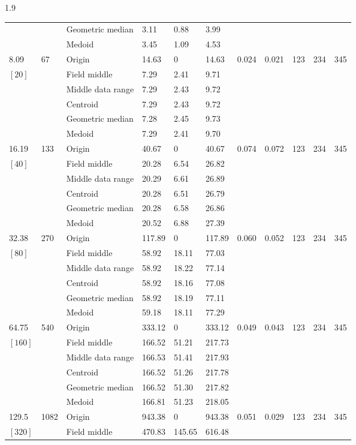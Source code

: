 \documentclass[phd]{ndsu-thesis-2022}
\newcommand\myspacing{1.9} %
\begin{document}
\begin{spacing}{\myspacing}
\begin{landscape}
{{\begin{ThreePartTable}
\begin{longtable}{lll lll ll rrr}
 &  & Geometric median & 3.11 & 0.88 & 3.99 \\
 &  & Medoid  & 3.45 & 1.09 & 4.53 \\
\midrule
8.09 & 67 & Origin  & 14.63 & 0 & 14.63 & 0.024 & 0.021 & 123 & 234 & 345 \\
$[20]$ &  & Field middle  & 7.29 & 2.41 & 9.71 \\
 &  & Middle data range  & 7.29 & 2.43 & 9.72 \\
 &  & Centroid & 7.29 & 2.43 & 9.72 \\
 &  & Geometric median & 7.28 & 2.45 & 9.73 \\
 &  & Medoid  & 7.29 & 2.41 & 9.70 \\ 
\midrule
16.19 & 133 & Origin  & 40.67 & 0 & 40.67 & 0.074 & 0.072 & 123 & 234 & 345 \\
$[40]$ &  & Field middle  & 20.28 & 6.54 & 26.82 \\
 &  & Middle data range  & 20.29 & 6.61 & 26.89 \\
 &  & Centroid & 20.28 & 6.51 & 26.79 \\
 &  & Geometric median & 20.28 & 6.58 & 26.86 \\
 &  & Medoid  & 20.52 & 6.88 & 27.39 \\
\midrule
32.38 & 270 & Origin  & 117.89 & 0 & 117.89 & 0.060 & 0.052 & 123 & 234 & 345 \\
$[80]$ &  & Field middle  & 58.92 & 18.11 & 77.03 \\
 &  & Middle data range  & 58.92 & 18.22 & 77.14 \\
 &  & Centroid & 58.92 & 18.16 & 77.08 \\
 &  & Geometric median & 58.92 & 18.19 & 77.11 \\
 &  & Medoid  & 59.18 & 18.11 & 77.29 \\
\midrule
64.75 & 540 & Origin  & 333.12 & 0 & 333.12 & 0.049 & 0.043 & 123 & 234 & 345 \\
$[160]$ &  & Field middle  & 166.52 & 51.21 & 217.73 \\
 &  & Middle data range  & 166.53 & 51.41 & 217.93 \\
 &  & Centroid & 166.52 & 51.26 & 217.78 \\
 &  & Geometric median & 166.52 & 51.30 & 217.82 \\
 &  & Medoid  & 166.81 & 51.23 & 218.05 \\
\midrule
129.5 & 1082 & Origin  & 943.38 & 0 & 943.38 & 0.051 & 0.029 & 123 & 234 & 345 \\
$[320]$ &  & Field middle  & 470.83 & 145.65 & 616.48 \\

\end{longtable}
\end{ThreePartTable}}}
\end{landscape}
\end{spacing}
\end{document}
